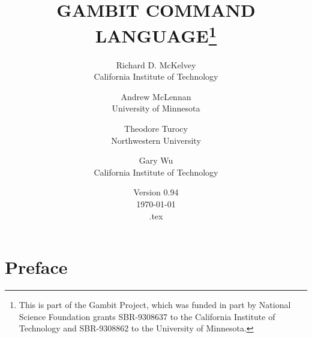 %
%
%


\renewcommand{\baselinestretch}{.9}
\newcommand{\bd}{\begin{description}}
\newcommand{\ed}{\end{description}}



\newcommand{\lex}[1]{\mark{#1}}

\makeatletter
\def\ps@lexicon{\def\@oddhead{\slshape\mysectionname\hfil 
{\Large\verb+\botmark+}\quad\thepage}
\def\@evenhead{\thepage\quad{\Large\verb+\firstmark+}\hfil \slshape\mysectionname}}
\makeatother

\newcommand{\mysectionname}{\thesection\,\, BUILT-IN FUNCTIONS}






\title{GAMBIT COMMAND LANGUAGE\thanks{This is part of the Gambit
Project, which was funded in part by National Science Foundation
grants SBR-9308637 to the California Institute of Technology and
SBR-9308862 to the University of Minnesota.}}

\author{Richard D. McKelvey\\California Institute of
Technology
\and
Andrew McLennan\\University of
Minnesota
\and 
Theodore Turocy\\Northwestern University
\and
Gary Wu\\California Institute of Technology
}

\date{Version 0.94\\ \today\\ \jobname.tex}

\maketitle

\tableofcontents

\chapter*{Preface}
\pagestyle{myheadings}

